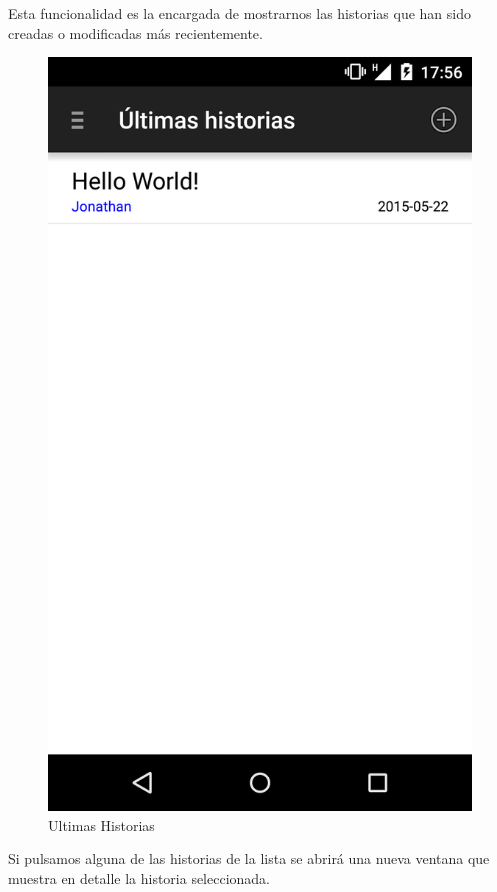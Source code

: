 \documentclass[11pt,a4paper, titlepage]{article}
\begin{document}
	Esta funcionalidad es la encargada de mostrarnos las historias que han sido creadas o modificadas más recientemente.
	
	\begin{figure}[hbtp]
		\centering
		\includegraphics[scale = 0.18 ]{img/4}
		\caption{Ultimas Historias}
		\label{p11}
	\end{figure}
	
	Si pulsamos alguna de las historias de la lista se abrirá una nueva ventana que muestra en detalle la historia seleccionada.
	
\end{document}
